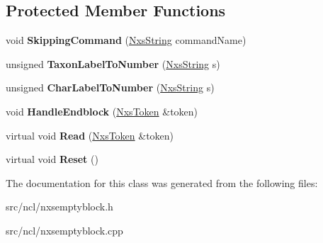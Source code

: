 \subsection*{Protected Member Functions}
\begin{DoxyCompactItemize}
\item 
\hypertarget{classNxsEmptyBlock_a954ac92f354a0f8a35d95ba4b48ebfd5}{
void {\bfseries SkippingCommand} (\hyperlink{classNxsString}{NxsString} commandName)}
\label{classNxsEmptyBlock_a954ac92f354a0f8a35d95ba4b48ebfd5}

\item 
\hypertarget{classNxsEmptyBlock_a4e9244ea2c99002369d17ea29265890e}{
unsigned {\bfseries TaxonLabelToNumber} (\hyperlink{classNxsString}{NxsString} s)}
\label{classNxsEmptyBlock_a4e9244ea2c99002369d17ea29265890e}

\item 
\hypertarget{classNxsEmptyBlock_a3ba3c4cc2e8d54d23606b295a1f85ecf}{
unsigned {\bfseries CharLabelToNumber} (\hyperlink{classNxsString}{NxsString} s)}
\label{classNxsEmptyBlock_a3ba3c4cc2e8d54d23606b295a1f85ecf}

\item 
\hypertarget{classNxsEmptyBlock_ab55cc172c8c22ed1964e529745c67b70}{
void {\bfseries HandleEndblock} (\hyperlink{classNxsToken}{NxsToken} \&token)}
\label{classNxsEmptyBlock_ab55cc172c8c22ed1964e529745c67b70}

\item 
\hypertarget{classNxsEmptyBlock_ac41146480434ddb64d9471b34dbc779e}{
virtual void {\bfseries Read} (\hyperlink{classNxsToken}{NxsToken} \&token)}
\label{classNxsEmptyBlock_ac41146480434ddb64d9471b34dbc779e}

\item 
\hypertarget{classNxsEmptyBlock_a08f186cd2108bde98519a77e186fa2ab}{
virtual void {\bfseries Reset} ()}
\label{classNxsEmptyBlock_a08f186cd2108bde98519a77e186fa2ab}

\end{DoxyCompactItemize}


The documentation for this class was generated from the following files:\begin{DoxyCompactItemize}
\item 
src/ncl/nxsemptyblock.h\item 
src/ncl/nxsemptyblock.cpp\end{DoxyCompactItemize}
